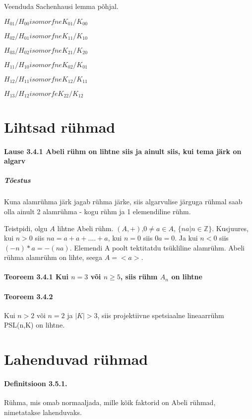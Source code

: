 \documentclass[12pt]{article}
\begin{document}
Veenduda Sachenhausi lemma põhjal. 

$H_{01} / H_{00} isomorfne K_{01} / K_{00}$

$H_{02}/ H_{01} isomorfne K_{11}/K_{10}$

$H_{03}/ H_{02} isomorfne K_{21}/K_{20}$

$H_{11} / H_{10} isomorfne K_{02}/K_{01}$

$H_{12} / H_{11} isomorfne K_{12}/K_{11}$

$H_{13} / H_{12} isomorfe K_{22}/K_{12}$

\section{Lihtsad r\"uhmad}

\paragraph{Lause 3.4.1 Abeli rühm on lihtne siis ja ainult siis, kui tema järk on algarv}

\subparagraph{Tõestus}
Kuna alamrühma järk jagab rühma järke, siis algarvulise järguga rühmal saab olla ainult 2 alamrühma - kogu rühm ja 1 elemendiline rühm.

Teistpidi, olgu $A$ lihtne Abeli rühm. $(A,+)$,$0 \neq a \in A$, $ \{na | n \in \mathbb{Z}\}$. Kusjuures, kui $n >0 $ siis $na = a + a + .... + a$, kui $n=0$ siis $0a = 0$. Ja kui $n < 0$ siis $(-n)*a = -(na)$. Elemendi A poolt tektitatdu ts\"ukliline alamr\"uhm. Abeli rühma alamr\"uhm on lihte, seega $A = < a >$. 

\paragraph{Teoreem 3.4.1 Kui $n = 3$ või $n \geq 5$, siis rühm $A_n$ on lihtne }
   
\paragraph{Teoreem 3.4.2} Kui $n > 2$ või $n=2$ ja $|K| > 3$, siis projektiivne spetsiaalne lineaarr\"uhm PSL(n,K) on lihtne. 

\section{Lahenduvad rühmad}

\paragraph{Definitsioon 3.5.1.} R\"uhma, mis omab normaaljada, mille kõik faktorid on Abeli rühmad, nimetatakse lahenduvaks.
\end{document}
